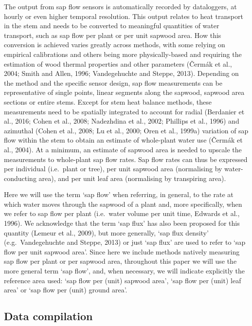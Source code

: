 \documentclass[11pt,twoside]{reedthesis}
\begin{document}
The output from sap flow sensors is automatically recorded by
dataloggers, at hourly or even higher temporal resolution. This output
relates to heat transport in the stem and needs to be converted to
meaningful quantities of water transport, such as sap flow per plant or
per unit sapwood area. How this conversion is achieved varies greatly
across methods, with some relying on empirical calibrations and others
being more physically-based and requiring the estimation of wood thermal
properties and other parameters (Čermák et al., 2004; Smith and Allen,
1996; Vandegehuchte and Steppe, 2013). Depending on the method and the
specific sensor design, sap flow measurements can be representative of
single points, linear segments along the sapwood, sapwood area sections
or entire stems. Except for stem heat balance methods, these
measurements need to be spatially integrated to account for radial
(Berdanier et al., 2016; Cohen et al., 2008; Nadezhdina et al., 2002;
Phillips et al., 1996) and azimuthal (Cohen et al., 2008; Lu et al.,
2000; Oren et al., 1999a) variation of sap flow within the stem to
obtain an estimate of whole-plant water use (Čermák et al., 2004). At a
minimum, an estimate of sapwood area is needed to upscale the
measurements to whole-plant sap flow rates. Sap flow rates can thus be
expressed per individual (i.e.~plant or tree), per unit sapwood area
(normalising by water-conducting area), and per unit leaf area
(normalising by transpiring area).\par

Here we will use the term `sap flow' when referring, in general, to the
rate at which water moves through the sapwood of a plant and, more
specifically, when we refer to sap flow per plant (i.e.~water volume per
unit time, Edwards et al., 1996). We acknowledge that the term `sap
flux' has also been proposed for this quantity (Lemeur et al., 2009),
but more generally, `sap flux density' (e.g.~Vandegehuchte and Steppe,
2013) or just `sap flux' are used to refer to `sap flow per unit sapwood
area'. Since here we include methods natively measuring sap flow per
plant or per sapwood area, throughout this paper we will use the more
general term `sap flow', and, when necessary, we will indicate
explicitly the reference area used: `sap flow per (unit) sapwood area',
`sap flow per (unit) leaf area' or `sap flow per (unit) ground
area'.\par 

\subsection{Data compilation}\label{data-compilation}
\end{document}
